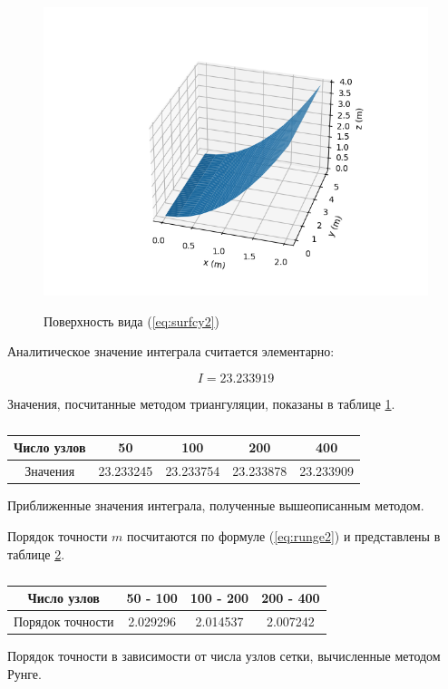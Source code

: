 \documentclass{article}
\begin{document}
\begin{figure}[H]
\centering
\includegraphics[width=0.8\linewidth]{squareSurf.png}
\caption[]{}
\label{fig:squareSurf}
Поверхность вида (\ref{eq:surfcy2})
\end{figure}

Аналитическое значение интеграла считается элементарно:

\begin{equation}
I = 23.233919
\end{equation}

Значения, посчитанные методом триангуляции, показаны в таблице \ref{table:square}.

\begin{table}[ht]
\centering
\begin{tabular}{|c|c|c|c|c|}
\hline
 Число узлов	& 50		& 100		& 200		& 400		\\ 
\hline
 Значения		& 23.233245	& 23.233754	& 23.233878	& 23.233909	\\  
\hline
\end{tabular}
\caption{\label{table:square}}
Приближенные значения интеграла, полученные вышеописанным методом.
\end{table}

Порядок точности $m$ посчитаются по формуле (\ref{eq:runge2}) и представлены в таблице \ref{tablee:porTochSquare}.

\begin{table}[ht]
\centering
\begin{tabular}{|c|c|c|c|}
\hline
 Число узлов		& 50 - 100	& 100 - 200	& 200 - 400	\\ 
\hline
 Порядок точности	& 2.029296	& 2.014537	& 2.007242	\\  
\hline
\end{tabular}
\caption{\label{tablee:porTochSquare}}
Порядок точности в зависимости от числа узлов сетки, вычисленные методом Рунге.
\end{table}
\end{document}
